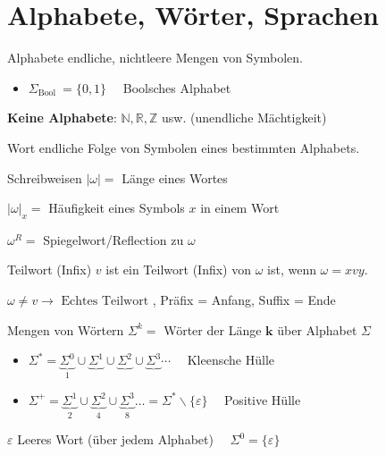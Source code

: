 \section*{Alphabete, Wörter, Sprachen}

\begin{definition}{Alphabete} endliche, nichtleere Mengen von Symbolen.
\begin{itemize}
  \item $\Sigma_{\text {Bool }}=\{0,1\} \quad$ Boolsches Alphabet
\end{itemize}
\textbf{Keine Alphabete}: $\mathbb{N}, \mathbb{R}, \mathbb{Z}$ usw. (unendliche Mächtigkeit)
\end{definition}

\begin{definition}{Wort}
    endliche Folge von Symbolen eines bestimmten Alphabets.
\end{definition}

\begin{definition}{Schreibweisen}
    $|\omega|=$ Länge eines Wortes

    $|\omega|_{x}=$ Häufigkeit eines Symbols $x$ in einem Wort

    $\omega^{R}=$ Spiegelwort/Reflection zu $\omega$
\end{definition}

\begin{definition}{Teilwort (Infix)}
    $v$ ist ein Teilwort (Infix) von $\omega$ ist, wenn $\omega=x v y$.

    $\omega \neq v \rightarrow \text { Echtes Teilwort }$, Präfix = Anfang, Suffix = Ende
\end{definition}

\begin{definition}{Mengen von Wörtern}
    $\Sigma^{k}=$ Wörter der Länge $\boldsymbol{k}$ über Alphabet $\Sigma$
    \begin{itemize}
        \item $\Sigma^{*}=\underbrace{\Sigma^{0}}_{1} \cup \underbrace{\Sigma^{1}} \cup \underbrace{\Sigma^{2}} \cup \underbrace{\Sigma^{3}} \cdots \quad$ Kleensche Hülle
        \item $\Sigma^{+}=\underbrace{\Sigma^{1}}_{2} \cup \underbrace{\Sigma^{2}}_{4} \cup \underbrace{\Sigma^{3}}_{8} \ldots=\Sigma^{*} \backslash\{\varepsilon\} \quad$ Positive Hülle
      \end{itemize}
\end{definition}

\begin{remark}
    $\varepsilon$ Leeres Wort (über jedem Alphabet) $\quad \Sigma^{0}=\{\varepsilon\}$
\end{remark}

